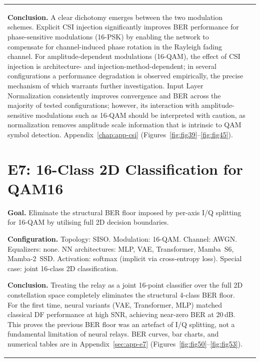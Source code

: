 {\begin{longtable}[]{@{}ll@{}}
\textbf{Conclusion.}
A clear dichotomy emerges between the two modulation schemes. Explicit CSI injection significantly improves BER performance for phase-sensitive modulations (16-PSK) by enabling the network to compensate for channel-induced phase rotation in the Rayleigh fading channel. For amplitude-dependent modulations (16-QAM), the effect of CSI injection is architecture- and injection-method-dependent; in several configurations a performance degradation is observed empirically, the precise mechanism of which warrants further investigation. Input Layer Normalization consistently improves convergence and BER across the majority of tested configurations; however, its interaction with amplitude-sensitive modulations such as 16-QAM should be interpreted with caution, as normalization removes amplitude scale information that is intrinsic to QAM symbol detection.
Appendix~\ref{chap:app-csi}
(Figures~\ref{fig:fig39}--\ref{fig:fig45}).

\section{E7: 16-Class 2D Classification for QAM16}\label{sec:class-2d-classification-for-qam16}

\textbf{Goal.}
Eliminate the structural BER floor imposed by per-axis I/Q splitting for 16-QAM by
utilising full 2D decision boundaries.

\textbf{Configuration.}
Topology: SISO.
Modulation: 16-QAM.
Channel: AWGN.
Equalizers: none.
NN architectures: MLP, VAE, Transformer, Mamba~S6, Mamba-2~SSD.
Activation: softmax (implicit via cross-entropy loss).
Special case: joint 16-class 2D classification.

\textbf{Conclusion.}
Treating the relay as a joint 16-point classifier over the full 2D constellation space
completely eliminates the structural 4-class BER floor.
For the first time, neural variants (VAE, Transformer, MLP) matched classical DF
performance at high SNR, achieving near-zero BER at 20\,dB.
This proves the previous BER floor was an artefact of I/Q splitting, not a fundamental
limitation of neural relays.
BER curves, bar charts, and numerical tables are in Appendix~\ref{sec:app-e7}
(Figures~\ref{fig:fig50}--\ref{fig:fig53}).


\end{longtable}}
